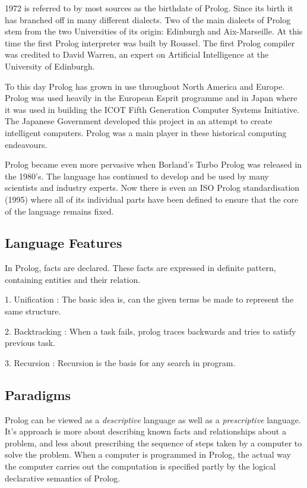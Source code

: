 \documentclass[a4paper, 12pt]{article}
\begin{document}
1972 is referred to by most sources as the birthdate of Prolog. Since its birth it has branched off in many different dialects. Two of the main dialects of Prolog stem from the two Universities of its origin: Edinburgh and Aix-Marseille. At this time the first Prolog interpreter was built by Roussel. The first Prolog compiler was credited to David Warren, an expert on Artificial Intelligence at the University of Edinburgh.

To this day Prolog has grown in use throughout North America and Europe. Prolog was used heavily in the European Esprit programme and in Japan where it was used in building the ICOT Fifth Generation Computer Systems Initiative. The Japanese Government developed this project in an attempt to create intelligent computers. Prolog was a main player in these historical computing endeavours.

Prolog became even more pervasive when Borland's Turbo Prolog was released in the 1980's. The language has continued to develop and be used by many scientists and industry experts. Now there is even an ISO Prolog standardisation (1995) where all of its individual parts have been defined to ensure that the core of the language remains fixed.
\subsection{Language Features}
In Prolog, facts are declared. These facts are expressed in definite pattern, containing entities and their relation.

1. Unification : The basic idea is, can the given terms be made to represent the same structure.

2. Backtracking : When a task fails, prolog traces backwards and tries to satisfy previous task.

3. Recursion : Recursion is the basis for any search in program.
\subsection{Paradigms}
Prolog can be viewed as a \textit{descriptive} language as well as a \textit{prescriptive} language. It's approach is more about describing known facts and relationships about a problem, and less about prescribing the sequence of steps taken by a computer to solve the problem. When a computer is programmed in Prolog, the actual way the computer carries out the computation is specified partly by the logical declarative semantics of Prolog.
\end{document}
